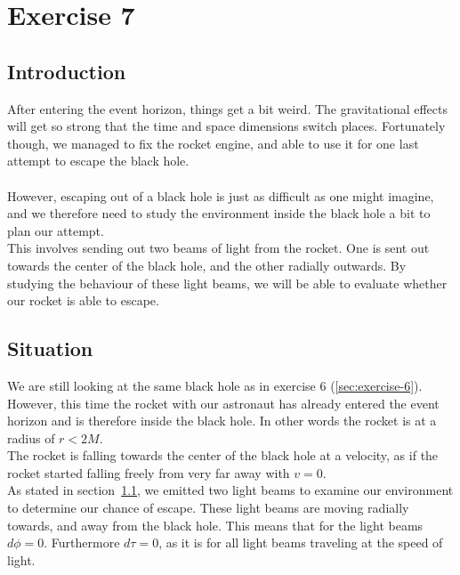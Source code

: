 \documentclass[reprint,english,notitlepage]{revtex4-2}
\begin{document}
\newpage
\section{Exercise 7}\label{sec:exercise-7}
    \subsection{Introduction}\label{subsec:introduction7}
        After entering the event horizon, things get a bit weird.
        The gravitational effects will get so strong that the time and space dimensions switch places.
        Fortunately though, we managed to fix the rocket engine, and able to use it for one last attempt to escape the black hole.\\\\
        However, escaping out of a black hole is just as difficult as one might imagine, and we therefore need to study the environment inside the black hole a bit to plan our attempt.\\
        This involves sending out two beams of light from the rocket.
        One is sent out towards the center of the black hole, and the other radially outwards.
        By studying the behaviour of these light beams, we will be able to evaluate whether our rocket is able to escape.

    \subsection{Situation}\label{subsec:situation7}
        We are still looking at the same black hole as in exercise 6 (\ref{sec:exercise-6}).
        However, this time the rocket with our astronaut has already entered the event horizon and is therefore inside the black hole.
        In other words the rocket is at a radius of $r < 2M$.\\
        The rocket is falling towards the center of the black hole at a velocity, as if the rocket started falling freely from very far away with $v = 0$.\\
        As stated in section~\ref{subsec:introduction7}, we emitted two light beams to examine our environment to determine our chance of escape.
        These light beams are moving radially towards, and away from the black hole.
        This means that for the light beams $d\phi = 0$.
        Furthermore $d\tau = 0$, as it is for all light beams traveling at the speed of light.
\end{document}
